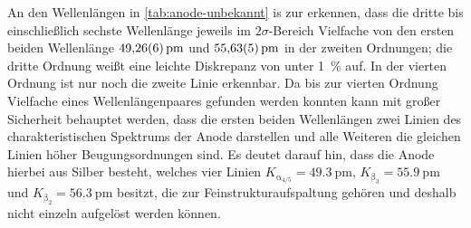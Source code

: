 An den Wellenlängen in \cref{tab:anode-unbekannt} is zur erkennen, dass die dritte bis einschließlich 
sechste Wellenlänge jeweils im $2\sigma$-Bereich Vielfache von den ersten beiden Wellenlänge $\SI{49.26\pm 0.06}{\pm}$
und $\SI{55.63\pm 0.05}{\pm}$ in der zweiten Ordnungen; die dritte Ordnung weißt eine leichte Diskrepanz von 
unter \SI{1}{\percent} auf. In der vierten Ordnung ist nur noch die zweite Linie erkennbar. Da bis zur vierten 
Ordnung Vielfache eines Wellenlängenpaares gefunden werden konnten kann mit großer Sicherheit 
behauptet werden, dass die ersten beiden Wellenlängen zwei Linien des charakteristischen Spektrums 
der Anode darstellen und alle Weiteren die gleichen Linien höher Beugungsordnungen sind. 
Es deutet darauf hin, dass die Anode hierbei aus Silber besteht, welches 
vier Linien $K_\mathrm{\alpha_{4/5}} = \SI{49.3}{\pm}$,  $K_\mathrm{\beta_3}=\SI{55.9}{\pm}$
und $K_\mathrm{\beta_2}=\SI{56.3}{\pm}$ besitzt, die zur Feinstrukturaufspaltung gehören und 
deshalb nicht einzeln aufgelöst werden können.